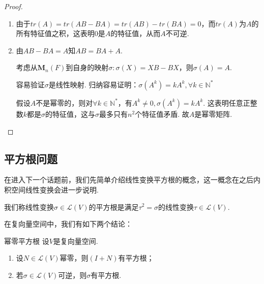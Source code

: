 \begin{proof}
    \begin{enumerate}
        \item 由于$tr(A)=tr(AB-BA)=tr(AB)-tr(BA)=0$，而$tr(A)$为$A$的所有特征值之积，这表明$0$是$A$的特征值，从而$A$不可逆.
        \item 由$AB-BA=A$知$AB=BA+A$.

        考虑从$\mathbf{M}_n(F)$到自身的映射$\sigma:\sigma(X)=XB-BX$，则$\sigma(A)=A$.

        容易验证$\sigma$是线性映射. 归纳容易证明：$\sigma(A^k)=kA^k,\forall k\in \mathbb{N}^*$

        假设$A$不是幂零的，则对$\forall k \in \mathbb{N}^*$，有$A^k \neq 0,\sigma(A^k)=kA^k$. 这表明任意正整数$k$都是$\sigma$的特征值，这与$\sigma$最多只有$n^2$个特征值矛盾. 故$A$是幂零矩阵.
    \end{enumerate}
\end{proof}

\subsection{平方根问题}

在进入下一个话题前，我们先简单介绍线性变换平方根的概念，这一概念在之后内积空间线性变换会进一步说明.
\begin{definition}{}{}
    我们称线性变换$\sigma\in \mathcal{L}(V)$的平方根是满足$\tau^2=\sigma$的线性变换$\tau\in \mathcal{L}(V)$.
\end{definition}
在复向量空间中，我们有如下两个结论：
\begin{theorem}{}{幂零平方根}
    设$V$是复向量空间.
    \begin{enumerate}
        \item 设$N\in \mathcal{L}(V)$幂零，则$(I+N)$有平方根；

        \item \label{item:16:幂零平方根:2}
              若$\sigma\in \mathcal{L}(V)$可逆，则$\sigma$有平方根.
    \end{enumerate}
\end{theorem}

